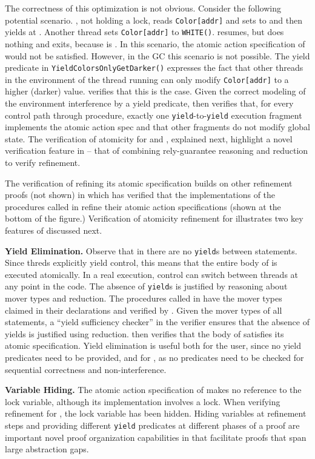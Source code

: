The correctness of this
optimization is not obvious. Consider the following potential
scenario. , not holding a lock, reads {\tt Color[addr]} and
sets  to  and then yields at
. Another thread sets {\tt Color[addr]} to
{\tt WHITE()}.  resumes, but does nothing and exits,
because  is . In this scenario, the atomic action
specification of  would not be satisfied. However, in the GC this
scenario is not possible. 
The yield
predicate in {\tt YieldColorsOnlyGetDarker()} expresses the fact that
other threads in the environment of the thread running  can
only modify {\tt Color[addr]} to a higher (darker)
value. \civl verifies that this is the case. Given the correct
modeling of the environment interference by a yield predicate,
\civl then verifies that, for every control path through 
procedure, exactly one {\tt yield}-to-{\tt yield} execution
fragment implements the atomic action spec and that other fragments do not modify
global state. The verification of atomicity for  and
, explained next, highlight a
novel verification feature in \civl -- that of combining
rely-guarantee reasoning and reduction to verify refinement.

The verification of  refining its atomic specification
builds on other refinement proofs (not shown) in which \civl has
verified that the implementations of the procedures called in
 refine their atomic action specifications (shown at the
bottom of the figure.) Verification of atomicity refinement for
 illustrates two key features of \civl discussed next. 

{\bf Yield Elimination.} Observe that in 
 there are no {\tt yield}s between
statements. Since threds explicitly yield control, this means that the
entire body of  is executed atomically. In
a real execution, control can switch between threads at any point in
the code. The absence of {\tt yield}s is justified by reasoning about
mover types and reduction. The procedures called in
 have the mover types claimed in their
declarations and verified by \civl. Given the mover types of all
statements, a ``yield sufficiency
checker'' in the \civl verifier ensures
that the absence of yields is justified using reduction.  \civl
then verifies that the body of  satisfies
its atomic specification. Yield elimination is useful both for the
user, since no yield predicates need to be provided, and for \civl,
as no predicates need to be checked for sequential correctness and
non-interference.

{\bf Variable Hiding.} The atomic action specification of 
makes no reference to the lock variable, although its implementation
involves a lock. When verifying refinement for , the lock
variable has been hidden. Hiding variables at refinement steps and
providing different {\tt yield} predicates at different phases of a
proof are important novel proof organization capabilities in \civl
that facilitate proofs that span large abstraction gaps.


